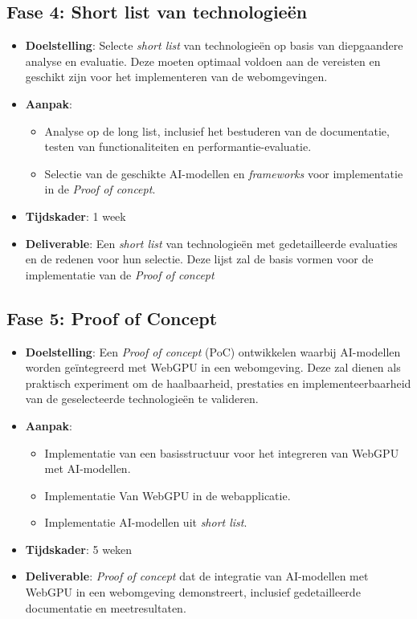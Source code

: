\subsection*{Fase 4: Short list van technologieën}
\begin{itemize}
  \item \textbf{Doelstelling}: Selecte \textit{short list} van technologieën op basis van diepgaandere analyse en evaluatie. Deze moeten optimaal voldoen aan de vereisten en geschikt zijn voor het implementeren van de webomgevingen.

  \item \textbf{Aanpak}:
  \begin{itemize}
    \item Analyse op de long list, inclusief het bestuderen van de documentatie, testen van functionaliteiten en performantie-evaluatie.
    \item Selectie van de geschikte AI-modellen en \textit{frameworks} voor implementatie in de \textit{Proof of concept}.
  \end{itemize}

  \item \textbf{Tijdskader}: 1 week
  \item \textbf{Deliverable}: Een \textit{short list} van technologieën met gedetailleerde evaluaties en de redenen voor hun selectie. Deze lijst zal de basis vormen voor de implementatie van de \textit{Proof of concept}
\end{itemize}

\subsection*{Fase 5: Proof of Concept}

\begin{itemize}
  \item \textbf{Doelstelling}: Een \textit{Proof of concept} (PoC) ontwikkelen waarbij AI-modellen worden geïntegreerd met WebGPU in een webomgeving. Deze zal dienen als praktisch experiment om de haalbaarheid, prestaties en implementeerbaarheid van de geselecteerde technologieën te valideren.

  \item \textbf{Aanpak}:
  \begin{itemize}
    \item Implementatie van een basisstructuur voor het integreren van WebGPU met AI-modellen.
    \item Implementatie Van WebGPU in de webapplicatie.
    \item Implementatie AI-modellen uit \textit{short list}.
  \end{itemize}

  \item \textbf{Tijdskader}: 5 weken
  \item \textbf{Deliverable}: \textit{Proof of concept} dat de integratie van AI-modellen met WebGPU in een webomgeving demonstreert, inclusief gedetailleerde documentatie en meetresultaten.
\end{itemize}

